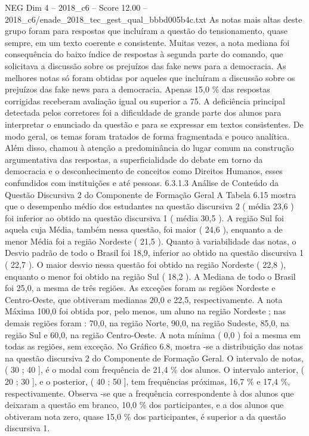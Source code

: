\begin{textsample}{NEG Dim 4 – 2018\_c6 – Score 12.00 – 2018\_c6/enade\_2018\_tec\_gest\_qual\_bbbd005b4c.txt}
As notas mais altas deste grupo foram para respostas que incluíram a questão do tensionamento, quase sempre, em um texto coerente e consistente.
Muitas vezes, a nota mediana foi consequência do baixo índice de respostas à segunda parte do comando, que solicitava a discussão sobre os prejuízos das fake news para a democracia.
As melhores notas só foram obtidas por aqueles que incluíram a discussão sobre os prejuízos das fake news para a democracia.
Apenas 15,0 \% das respostas corrigidas receberam avaliação igual ou superior a 75.
A deficiência principal detectada pelos corretores foi a dificuldade de grande parte dos alunos para interpretar o enunciado da questão e para se expressar em textos consistentes.
De modo geral, os temas foram tratados de forma fragmentada e pouco analítica.
Além disso, chamou à atenção a predominância do lugar comum na construção argumentativa das respostas, a superficialidade do debate em torno da democracia e o desconhecimento de conceitos como Direitos Humanos, esses confundidos com instituições e até pessoas. 6.3.1.3 Análise de Conteúdo da Questão Discursiva 2 do Componente de Formação Geral A Tabela 6.15 mostra que o desempenho médio dos estudantes na questão discursiva 2 ( média 23,6 ) foi inferior ao obtido na questão discursiva 1 ( média 30,5 ).
A região Sul foi aquela cuja Média, também nessa questão, foi maior ( 24,6 ), enquanto a de menor Média foi a região Nordeste ( 21,5 ).
Quanto à variabilidade das notas, o Desvio padrão de todo o Brasil foi 18,9, inferior ao obtido na questão discursiva 1 ( 22,7 ).
O maior desvio nessa questão foi obtido na região Nordeste ( 22,8 ), enquanto o menor foi obtido na região Sul ( 18,2 ).
A Mediana de todo o Brasil foi 25,0, a mesma de três regiões.
As exceções foram as regiões Nordeste e Centro-Oeste, que obtiveram medianas 20,0 e 22,5, respectivamente.
A nota Máxima 100,0 foi obtida por, pelo menos, um aluno na região Nordeste ; nas demais regiões foram : 70,0, na região Norte, 90,0, na região Sudeste, 85,0, na região Sul e 60,0, na região Centro-Oeste.
A nota mínima ( 0,0 ) foi a mesma em todas as regiões, sem exceção.
No Gráfico 6.8, mostra -se a distribuição das notas na questão discursiva 2 do Componente de Formação Geral.
O intervalo de notas, ( 30 ; 40 ], é o modal com frequência de 21,4 \% dos alunos.
O intervalo anterior, ( 20 ; 30 ], e o posterior, ( 40 ; 50 ], tem frequências próximas, 16,7 \% e 17,4 \%, respectivamente.
Observa -se que a frequência correspondente à dos alunos que deixaram a questão em branco, 10,0 \% dos participantes, e a dos alunos que obtiveram nota zero, quase 15,0 \% dos participantes, é superior a da questão discursiva 1.

\end{textsample}
